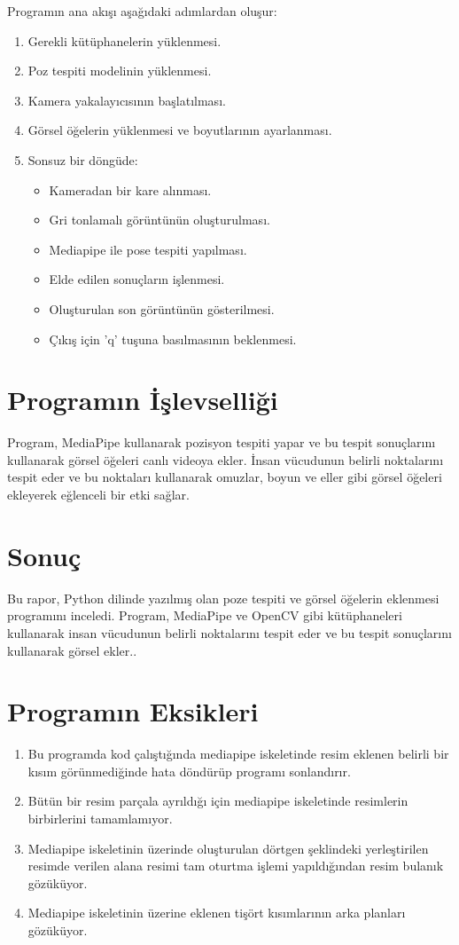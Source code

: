 \documentclass[12pt, a4paper]{article}
\begin{document}
Programın ana akışı aşağıdaki adımlardan oluşur:

\begin{enumerate}
	\item Gerekli kütüphanelerin yüklenmesi.
	\item Poz tespiti modelinin yüklenmesi.
	\item Kamera yakalayıcısının başlatılması.
	\item Görsel öğelerin yüklenmesi ve boyutlarının ayarlanması.
	\item Sonsuz bir döngüde:
	\begin{itemize}
		\item Kameradan bir kare alınması.
		\item Gri tonlamalı görüntünün oluşturulması.
		\item Mediapipe ile pose tespiti yapılması.
		\item Elde edilen sonuçların işlenmesi.
		\item Oluşturulan son görüntünün gösterilmesi.
		\item Çıkış için 'q' tuşuna basılmasının beklenmesi.
	\end{itemize}
\end{enumerate}

\section{Programın İşlevselliği}

Program, MediaPipe kullanarak pozisyon tespiti yapar ve bu tespit sonuçlarını kullanarak görsel öğeleri canlı videoya ekler. İnsan vücudunun belirli noktalarını tespit eder ve bu noktaları kullanarak omuzlar, boyun ve eller gibi görsel öğeleri ekleyerek eğlenceli bir etki sağlar.

\section{Sonuç}

Bu rapor, Python dilinde yazılmış olan poze tespiti ve görsel öğelerin eklenmesi programını inceledi. Program, MediaPipe ve OpenCV gibi kütüphaneleri kullanarak insan vücudunun belirli noktalarını tespit eder ve bu tespit sonuçlarını kullanarak görsel ekler.\cite{ChatGPT3.5}.
\section{Programın Eksikleri}
\begin{enumerate}
	\item Bu programda kod çalıştığında mediapipe iskeletinde resim eklenen belirli bir kısım görünmediğinde hata döndürüp programı sonlandırır.
	\item Bütün bir resim parçala ayrıldığı için mediapipe iskeletinde resimlerin birbirlerini tamamlamıyor.
	\item Mediapipe iskeletinin üzerinde oluşturulan dörtgen şeklindeki yerleştirilen resimde verilen alana resimi tam oturtma işlemi yapıldığından resim bulanık gözüküyor.
	\item Mediapipe iskeletinin üzerine eklenen tişört kısımlarının arka planları gözüküyor.
	\newpage 
	
	
\end{enumerate}
\end{document}

